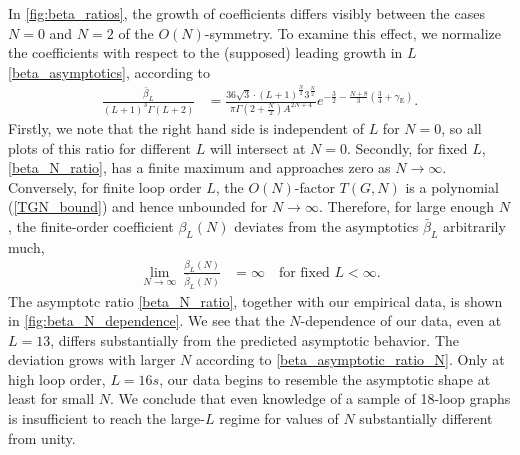 \documentclass[12pt,a4paper]{article}
\renewcommand{\|}{\rule[-0.4ex]{0.2ex}{1.2em}}
\begin{document}
In \cref{fig:beta_ratios}, the growth of coefficients differs visibly between the cases $N=0$ and $N=2$ of the $O(N)$-symmetry.  To examine this effect, we normalize the coefficients with respect to the (supposed) leading growth in $L$ \cref{beta_asymptotics}, according to 
\begin{align}\label{beta_N_ratio}
\frac{\bar \beta_L}{(L+1)^3 \Gamma(L+2)} &=  \frac{36 \sqrt 3\cdot (L+1)^{ \frac{N}{2}}3^{ \frac{N}{2}}  }{\pi   \Gamma \left( 2+\frac{N}{2} \right) A^{2N+4} } e^{-\frac 32 - \frac{N+8}{3}\left( \frac 3 4 + \gamma_\text{E} \right)   } .
\end{align}
Firstly, we note   that the right hand side is independent of $L$ for $N=0$, so all plots of this ratio for different $L$ will intersect at $N=0$.
Secondly, for fixed $L$, \cref{beta_N_ratio}, has a finite maximum and approaches zero as $N\rightarrow\infty$. Conversely, for finite loop order $L$, the $O(N)$-factor $T(G,N)$ is a polynomial (\cref{TGN_bound}) and hence unbounded for $N\rightarrow \infty$. Therefore, for large enough $N$, the finite-order coefficient $\beta_L(N)$  deviates from the asymptotics $\bar \beta_L$ arbitrarily much, 
\begin{align}\label{beta_asymptotic_ratio_N}
\lim_{N \rightarrow \infty} ~\frac{\beta_L(N)}{\bar \beta_L(N)} &= \infty \quad \text{for fixed }L<\infty.
\end{align}
The asymptotc ratio \cref{beta_N_ratio}, together with our empirical data, is shown in \cref{fig:beta_N_dependence}. We see that the $N$-dependence of our data, even at $L=13$, differs  substantially from the predicted asymptotic behavior. The deviation grows with larger $N$ according to \cref{beta_asymptotic_ratio_N}. Only at high loop order, $L=16s$, our data begins to resemble the asymptotic shape at least for small $N$. We conclude that even knowledge of a sample of 18-loop graphs is insufficient to reach the large-$L$ regime for values of $N$ substantially different from unity. 
 
\end{document}
